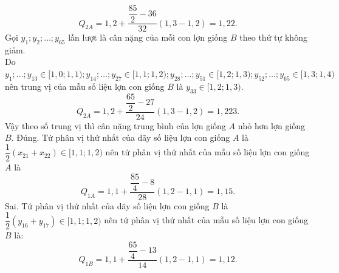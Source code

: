 \begin{ex}
{\begin{itemchoice}
   \[Q_{2A}=1{,}2+\dfrac{\dfrac{85}{2}-36}{32}  (1{,}3-1{,}2)=1{,}22.\]
   Gọi $y_1;y_2;\ldots;y_{65}$ lần lượt là cân nặng của mỗi con  lợn giống $B$ theo thứ tự không giảm.\\
   Do $y_1;\ldots;y_{13} \in [1{,}0;1{,}1);y_{14};\ldots;y_{27} \in [1{,}1;1{,}2);y_{28};\ldots;y_{51} \in [1{,}2;1{,}3);y_{52};\ldots;y_{65} \in [1{,}3;1{,}4)$ nên trung vị của mẫu số liệu lợn con giống  $B$ là $y_{33} \in [1{,}2;1{,}3)$.
    \[Q_{2A}=1{,}2+\dfrac{\dfrac{65}{2}-27}{24} (1{,}3-1{,}2)=1{,}223.\]
    Vậy theo số trung vị thì cân nặng trung bình của lợn giống $A$ nhỏ hơn lợn giống $B$.
   \itemch Đúng. Tứ phân vị thứ nhất của  dãy số liệu lợn con giống $A$ là $\dfrac{1}{2} \left(x_{21}+x_{22} \right)\in [1{,}1;1{,}2)$ nên tứ phân vị thứ nhất của mẫu số liệu lợn con giống $A$ là
    \[Q_{1A}=1{,}1+\dfrac{\dfrac{85}{4}-8}{28} (1{,}2-1{,}1)=1{,}15.\]
   \itemch Sai. Tứ phân vị thứ nhất của dãy số liệu lợn con giống $B$ là $\dfrac{1}{2} \left(y_{16}+y_{17} \right)\in [1{,}1;1{,}2)$ nên tứ  phân vị thứ nhất của mẫu số liệu lợn con giống $B$ là:
   \[Q_{1B}=1{,}1+\dfrac{\dfrac{65}{4}-13}{14}  (1{,}2-1{,}1)=1{,}12.\]
  \end{itemchoice}
  }
\end{ex}

